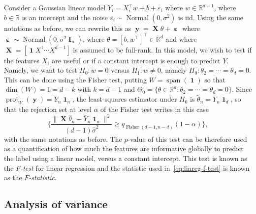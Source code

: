 \documentclass[
	fontsize=11pt, %
	twoside=false, %
	numbers=noenddot, %
]{kaobook}
\DeclareMathOperator{\bI}{{\boldsymbol I}}
\DeclareMathOperator{\bX}{{\boldsymbol X}}
\DeclareMathOperator{\by}{{\boldsymbol y}}
\DeclareMathOperator{\bone}{\boldsymbol 1}
\DeclareMathOperator{\beps}{\boldsymbol \varepsilon}
\DeclareMathOperator{\fis}{Fisher}
\DeclareMathOperator{\nor}{Normal}
\DeclareMathOperator*{\spa}{span}
\DeclareMathOperator{\proj}{proj}
\newcommand{\eps}{\varepsilon}
\newcommand{\R}{\mathbb R}
\newcommand{\wh}{\widehat}
\newcommand{\wt}{\widetilde}
\newcommand{\norm}[1]{\| #1 \|}
\begin{document}
\begin{example}
	Consider a Gaussian linear model $Y_i = X_i^\top w + b + \eps_i$ where $w \in \R^{d-1}$, where $b \in \R$ is an intercept%
	and the noise $\eps_i \sim \nor(0, \sigma^2)$ is iid. Using the same notations as before, we can rewrite this as $\by = \bX \theta + \beps$ where $\beps \sim \nor(0, \sigma^2 \bI_n)$, where $\theta = [b, w^\top]^\top \in \R^d$ and where $\bX = [\bone X^1 \cdots X^{d-1}]$ is assumed to be full-rank. In this model, we wish to test if the features $X_i$ are useful or if a constant intercept is enough to predict $Y$.
	Namely, we want to test $H_0 : w = 0$ versus $H_1 : w \neq 0$, namely $H_0 : \theta_2 = \cdots = \theta_d = 0$. This can be done using the Fisher test, putting $W = \spa(\bone)$ so that $\dim(W) = 1 = d - k$ with $k = d - 1$ and $\Theta_0 = \{ \theta \in \R^d : \theta_2 = \cdots = \theta_d = 0 \}$. 
	Since $\proj_W(\by) = \bar Y_n \bone_n$, the least-squares estimator under $H_0$ is $\wt \theta_n = \bar Y_n \bone_d$, so that the rejection set at level $\alpha$ of the Fisher test writes in this case 
	\begin{equation}
		\label{eq:linreg-f-test}
		\bigg\{  \frac{\norm{\bX \wh \theta_n - \bar Y_n \bone_n}^2}{(d - 1) \wh \sigma^2}  
		\geq q_{\fis(d-1, n-d)}(1 - \alpha)  \bigg\},
	\end{equation}
	with the same notations as before. The $p$-value of this test can be therefore used as a quantification of how much the features are informative globally to predict the label using a linear model, versus a constant intercept. This test is known as the \emph{$F$-test} for linear regression and the statistic used in~\eqref{eq:linreg-f-test} is known as the \emph{$F$-statistic}.
\end{example}

\subsection{Analysis of variance} %
\label{sub:analysis_of_variance}
\end{document}
